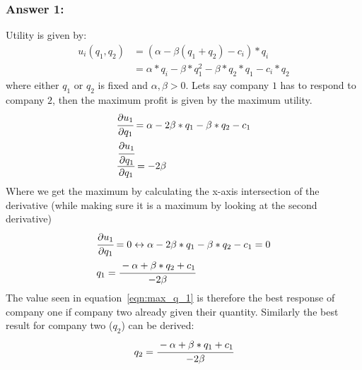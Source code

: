 \documentclass[11pt]{article}
\begin{document}
    \subsubsection{Answer 1:}
    Utility is given by:
    \begin{equation}
        \begin{split}
            u_i(q_1,q_2)&=(\alpha -\beta(q_1+q_2) - c_i)*q_i\\
            &=\alpha*q_i -\beta*q_1^2 -\beta*q_2*q_1 - c_i*q_2
        \end{split}
    \end{equation}
    where either $q_1$ or $q_2$ is fixed and $\alpha, \beta>0$.
    Lets say company $1$ has to respond to company $2$, then the maximum profit is given by the maximum utility.
    \begin{align}
        & \cfrac{\partial u_1}{\partial q_1}=\alpha - 2\beta*q_1 - \beta*q_2 - c_1\\
        & \cfrac{\cfrac{\partial u_1}{\partial q_1}}{\partial q_1}=-2\beta
    \end{align}
    Where we get the maximum by calculating the x-axis intersection of the derivative (while making sure it is a maximum by
    looking at the second derivative)
    \begin{align}
        &\cfrac{\partial u_1}{\partial q_1}=0 \leftrightarrow \alpha - 2\beta*q_1 - \beta*q_2 - c_1=0\\
        & q_1 = \cfrac{-\alpha+\beta*q_2 + c_1}{-2\beta}
        \label{eqn:max_q_1}
    \end{align}
    The value seen in equation~\ref{eqn:max_q_1} is therefore the best response of company one if company two already
    given their quantity. Similarly the best result for company two ($q_2$) can be derived:
    \begin{equation*}
        q_2 = \cfrac{-\alpha+\beta*q_1 + c_1}{-2\beta}
    \end{equation*}
\end{document}
